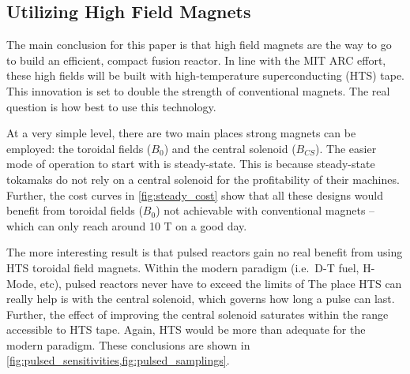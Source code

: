 \clearpage

\newpage

\subsection{Utilizing High Field Magnets}

The main conclusion for this paper is that high field magnets are the way to go to build an efficient, compact fusion reactor. In line with the MIT ARC effort, these high fields will be built with high-temperature superconducting (HTS) tape. This innovation is set to double the strength of conventional magnets. The real question is how best to use this technology.

At a very simple level, there are two main places strong magnets can be employed: the toroidal fields ($B_0$) and the central solenoid ($B_{CS}$). The easier mode of operation to start with is steady-state. This is because steady-state tokamaks do not rely on a central solenoid for the profitability of their machines. Further, the cost curves in \cref{fig:steady_cost} show that all these designs would benefit from toroidal fields ($B_0$) not achievable with conventional magnets -- which can only reach around 10 T on a good day.

The more interesting result is that pulsed reactors gain no real benefit from using HTS toroidal field magnets. Within the modern paradigm (i.e.\ D-T fuel, H-Mode, etc), pulsed reactors never have to exceed the limits of  The place HTS can really help is with the central solenoid, which governs how long a pulse can last. Further, the effect of improving the central solenoid saturates within the range accessible to HTS tape. Again, HTS would be more than adequate for the modern paradigm. These conclusions are shown in \cref{fig:pulsed_sensitivities,fig:pulsed_samplings}.

